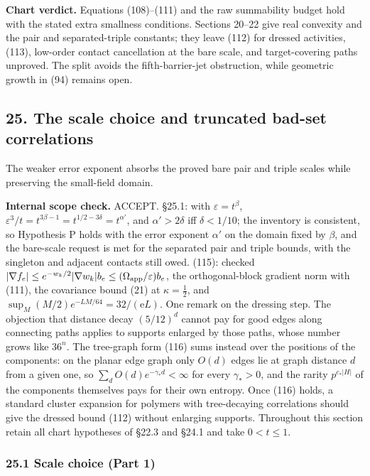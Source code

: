 \documentclass[11pt,a4paper]{article}
\begin{document}
\textbf{Chart verdict.} Equations (108)--(111) and the raw summability
budget hold with the stated extra smallness conditions. Sections 20--22
give real convexity and the pair and separated-triple constants; they
leave (112) for dressed activities, (113), low-order contact
cancellation at the bare scale, and target-covering paths unproved. The
split avoids the fifth-barrier-jet obstruction, while geometric growth
in (94) remains open.

\hypertarget{the-scale-choice-and-truncated-bad-set-correlations}{%
\subsection{25. The scale choice and truncated bad-set
correlations}\label{the-scale-choice-and-truncated-bad-set-correlations}}

The weaker error exponent absorbs the proved bare pair and triple scales
while preserving the small-field domain.

\textbf{Internal scope check.} ACCEPT. §25.1: with
\(\varepsilon=t^\beta\),
\(\varepsilon^3/t=t^{3\beta-1}=t^{1/2-3\delta}=t^{\alpha'}\), and
\(\alpha'>2\delta\) iff \(\delta<1/10\); the inventory is consistent, so
Hypothesis P holds with the error exponent \(\alpha'\) on the domain
fixed by \(\beta\), and the bare-scale request is met for the separated
pair and triple bounds, with the singleton and adjacent contacts still
owed. (115): checked
\(|\nabla f_e|\le e^{-w_k/2}|\nabla w_k|b_e\le(\Omega_{\rm app}/\varepsilon)b_e\),
the orthogonal-block gradient norm with (111), the covariance bound (21)
at \(\kappa=\frac12\), and \(\sup_M(M/2)e^{-LM/64}=32/(\mathrm eL)\).
One remark on the dressing step. The objection that distance decay
\((5/12)^d\) cannot pay for good edges along connecting paths applies to
supports enlarged by those paths, whose number grows like \(36^n\). The
tree-graph form (116) sums instead over the positions of the components:
on the planar edge graph only \(O(d)\) edges lie at graph distance \(d\)
from a given one, so \(\sum_dO(d)e^{-\gamma_*d}<\infty\) for every
\(\gamma_*>0\), and the rarity \(p^{c_*|H|}\) of the components
themselves pays for their own entropy. Once (116) holds, a standard
cluster expansion for polymers with tree-decaying correlations should
give the dressed bound (112) without enlarging supports. Throughout this
section retain all chart hypotheses of §22.3 and §24.1 and take
\(0<t\le1\).

\hypertarget{scale-choice-part-1}{%
\subsubsection{25.1 Scale choice (Part 1)}\label{scale-choice-part-1}}
\end{document}
